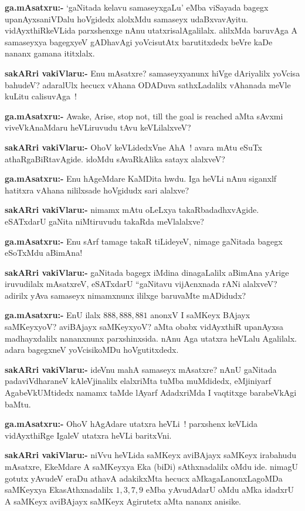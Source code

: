 \smallskip
\noindent
\textbf{ga.mAsatxru:-} `gaNitada kelavu samaseyxgaLu' eMba viSayada bagegx upanAyxsaniVDalu hoVgidedx alolxMdu samaseyx udaBxvavAyitu. vidAyxthiRkeVLida parxshenxge nAnu utatxrisalAgalilalx. alilxMda baruvAga A samaseyxya bagegxyeV gADhavAgi yoVcisutAtx barutitxdedx beVre kaDe nananx gamana ititxlalx.

\smallskip
\noindent
\textbf{sakARri vakiVlaru:-} Enu mAsatxre? samaseyxyanunx hiVge dAriyalilx yoVcisa bahudeV? adaralUlx hecucx vAhana ODADuva sathxLadalilx vAhanada meVle kuLitu calisuvAga~!

\smallskip
\noindent
\textbf{ga.mAsatxru:-} {\rm Awake, Arise, stop not, till the goal is reached} aMta sAvxmi viveVkAnaMdaru heVLiruvudu tAvu keVLilalxveV?

\smallskip
\noindent
\textbf{sakARri vakiVlaru:-} OhoV keVLidedxVne AhA~! avara mAtu eSuTx athaRgaBiRtavAgide. idoMdu sAvaRkAlika satayx alalxveV?

\smallskip
\noindent
\textbf{ga.mAsatxru:-} Enu hAgeMdare KaMDita hwdu. Iga heVLi nAnu siganxlf hatitxra vAhana nililxsade hoVgidudx sari alalxve?

\smallskip
\noindent
\textbf{sakARri vakiVlaru:-} nimamx mAtu oLeLxya takaRbadadhxvAgide. eSATxdarU gaNita niMtiru\-vudu takaRda meVlalalxve?

\smallskip
\noindent
\textbf{ga.mAsatxru:-} Enu sArf tamage takaR tiLideyeV, nimage gaNitada bagegx eSoTxMdu aBimAna!

\smallskip
\noindent
\textbf{sakARri vakiVlaru:-} gaNitada bagegx iMdina dinagaLalilx aBimAna yArige iruvudilalx mAsatxreV,  eSATxdarU ``gaNitavu vijAcnxnada rANi alalxveV? adirilx yAva samaseyx nimamxnunx ililxge baruvaMte mADidudx?

\smallskip
\noindent
\textbf{ga.mAsatxru:-} EnU ilalx $888, 888, 881$  anonxV I saMKeyx BAjayx saMKeyxyoV? aviBAjayx saMKeyxyoV? aMta obabx vidAyxthiR upanAyxsa madhayxdalilx nananxnunx parxshinxsida. nAnu Aga utatxra heVLalu Agalilalx. adara bagegxneV yoVcisikoMDu hoVgutitxdedx.

\smallskip
\noindent
\textbf{sakARri vakiVlaru:-} ideVnu mahA samaseyx mAsatxre? nAnU gaNitada padaviVdharaneV kAleVjinalilx elalxriMta tuMba muMdidedx, eMjiniyarf AgabeVkUMtidedx namamx taMde lAyarf AdadxriMda I vaqtitxge barabeVkAgi baMtu.

\smallskip
\noindent
\textbf{ga.mAsatxru:-} OhoV hAgAdare utatxra heVLi~! parxshenx keVLida vidAyxthiRge IgaleV utatxra heVLi baritxVni.

\smallskip
\noindent
\textbf{sakARri vakiVlaru:-} niVvu heVLida saMKeyx aviBAjayx saMKeyx irabahudu mAsatxre, EkeMdare A saMKeyxya Eka (biDi) sAthxnadalilx oMdu ide. nimagU gotutx yAvudeV eraDu athavA adakikxMta hecucx aMkagaLanonxLagoMDa saMKeyxya EkasAthxnadalilx $1, 3, 7, 9$ eMba yAvudAdarU oMdu aMka idadxrU A saMKeyx aviBAjayx saMKeyx Agirutetx aMta nananx anisike.

